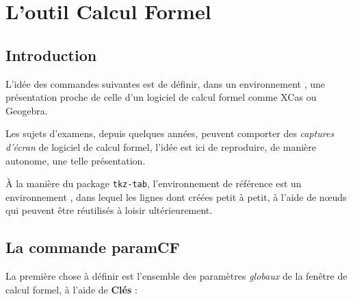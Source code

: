 \documentclass{article}
\newcommand\Cle[1]{{\bfseries\sffamily\textlangle #1\textrangle}}
\begin{document}
\newpage

\section{L'outil \og Calcul Formel \fg}

\subsection{Introduction}

L'idée des commandes suivantes est de définir, dans un environnement \TikZ, une présentation proche de celle d'un logiciel de calcul formel comme \textsf{XCas} ou \textsf{Geogebra}.

\smallskip

Les sujets d'examens, depuis quelques années, peuvent comporter des \textit{captures d'écran} de logiciel de calcul formel, l'idée est ici de reproduire, de manière autonome, une telle présentation.

\smallskip

À la manière du package \lstinline|tkz-tab|, l'environnement de référence est un environnement \TikZ, dans lequel les lignes dont créées petit à petit, à l'aide de nœuds qui peuvent être réutilisés à loisir ultérieurement.

\subsection{La commande \og paramCF \fg}

La première chose à définir est l'ensemble des paramètres \textit{globaux} de la fenêtre de calcul formel, à l'aide de \Cle{Clés} :
\end{document}
